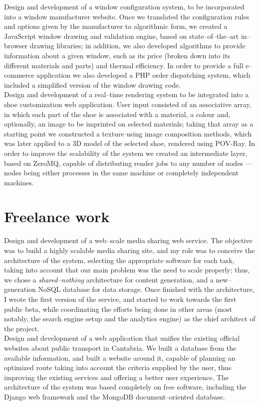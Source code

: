 \documentclass[11pt, a4paper]{article}
\newcommand{\years}[1]{\marginnote{\scriptsize #1}}
\begin{document}
\years{2012\\\textsc{ITEISA}}Design and development of a window configuration system, to be incorporated into a window manufacturer website. Once we translated the configuration rules and options given by the manufacturer to algorithmic form, we created a JavaScript window drawing and validation engine, based on state--of--the--art in--browser drawing libraries; in addition, we also developed algorithms to provide information about a given window, such as its price (broken down into its different materials and parts) and thermal efficiency. In order to provide a full e--commerce application we also developed a PHP order dispatching system, which included a simplified version of the window drawing code.\\
\years{2012\\\textsc{ITEISA}}Design and development of a real--time rendering system to be integrated into a shoe customization web application. User input consisted of an associative array, in which each part of the shoe is associated with a material, a colour and, optionally, an image to be imprinted on selected materials; taking that array as a starting point we constructed a texture using image composition methods, which was later applied to a 3D model of the selected shoe, rendered using POV-Ray. In order to improve the scalability of the system we created an intermediate layer, based on ZeroMQ, capable of distributing render jobs to any number of nodes ---nodes being either processes in the same machine or completely independent machines.


\section*{Freelance work} %
\noindent
\years{2010--present}Design and development of a web--scale media sharing web service. The objective was to build a highly scalable media sharing site, and my role was to conceive the architecture of the system, selecting the appropriate software for each task, taking into account that our main problem was the need to scale properly; thus, we chose a \textit{shared--nothing} architecture for content generation, and a new--generation NoSQL database for data storage. Once finished with the architecture, I wrote the first version of the service, and started to work towards the first public beta, while coordinating the efforts being done in other areas (most notably, the search engine setup and the analytics engine) as the chief architect of the project.\\
\years{2011}Design and development of a web application that unifies the existing official websites about public transport in Cantabria. We built a database from the available information, and built a website around it, capable of planning an optimized route taking into account the criteria supplied by the user, thus improving the existing services and offering a better user experience. The architecture of the system was based completely on free software, including the Django web framework and the MongoDB document--oriented database.
\end{document}
